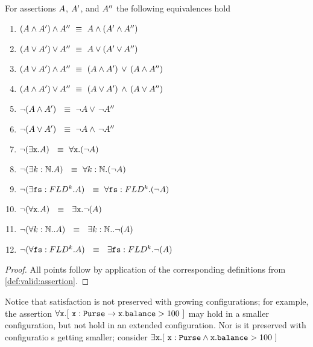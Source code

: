 \begin{lemma}
For     assertions $A$, $A'$, and $A''$ the following equivalences hold
\label{lemma:basic_assertions_classical}
\begin{enumerate}
\item
$(A \wedge A') \wedge A'' \ \equiv \  A \wedge (A' \wedge A'')$
\item 
$(A \vee A') \vee A'' \ \equiv \  A \vee (A' \vee A'')$
\item 
$(A \vee A') \wedge A'' \ \equiv \  (A \wedge A')\, \vee\, (A \wedge A'')$
\item 
$(A \wedge A') \vee A'' \ \equiv \  (A \vee A')\, \wedge\, (A \vee A'')$
\item 
$\neg (A \wedge A') \  \ \equiv \  \neg  A   \vee\, \neg A''$
\item 
$\neg (A \vee A') \  \ \equiv \  \neg  A   \wedge\, \neg A''$
\item
$\neg (\exists \prg{x}.\A )  \  \ \equiv \  \forall \prg{x}.(\neg  \A)$
\item
$\neg (\exists k:\mathbb{N}.\A )  \  \ \equiv \  \forall  k:\mathbb{N}.(\neg  \A)$
\item
$\neg (\exists {\mbox{\tt{fs}}}:FLD^k.A )  \  \ \equiv \  \forall {\mbox{\tt{fs}}}:FLD^k.(\neg  A)$
\item
$\neg (\forall \prg{x}. \A)  \  \ \equiv \  \  \exists \prg{x}.\neg(\A )$
\item
$\neg (\forall k:\mathbb{N}.. \A)  \  \ \equiv \  \  \exists k:\mathbb{N}..\neg(\A )$
\item
$\neg (\forall {\mbox{\tt{fs}}}:FLD^k. A)  \  \ \equiv \  \  \exists {\mbox{\tt{fs}}}:FLD^k.\neg(A )$
\end{enumerate}
\end{lemma}
\begin{proof}
All points follow by application of the corresponding definitions from \ref{def:valid:assertion}.
 \end{proof}

Notice that satisfaction is not preserved with growing configurations; for example, the assertion $\forall {\mbox{\tt{x}}}. [\ {\mbox{\tt{x}}} : {\mbox{\tt{Purse}}} \rightarrow {\mbox{\tt{x}}}.{\mbox{\tt{balance}}}>100\ ]$ may hold in a smaller configuration, but not hold in an extended configuration. Nor is it preserved with configuratio s getting smaller; consider \eg $\exists {\mbox{\tt{x}}}. [\ {\mbox{\tt{x}}} : {\mbox{\tt{Purse}}} \wedge {\mbox{\tt{x}}}.{\mbox{\tt{balance}}}>100\ ]$
  
